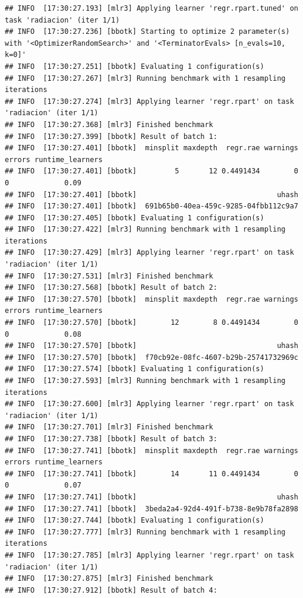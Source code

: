 \documentclass[
  11pt,
  a4paper,
]{article}
\begin{document}
\begin{verbatim}
## INFO  [17:30:27.193] [mlr3] Applying learner 'regr.rpart.tuned' on task 'radiacion' (iter 1/1)
## INFO  [17:30:27.236] [bbotk] Starting to optimize 2 parameter(s) with '<OptimizerRandomSearch>' and '<TerminatorEvals> [n_evals=10, k=0]'
## INFO  [17:30:27.251] [bbotk] Evaluating 1 configuration(s)
## INFO  [17:30:27.267] [mlr3] Running benchmark with 1 resampling iterations
## INFO  [17:30:27.274] [mlr3] Applying learner 'regr.rpart' on task 'radiacion' (iter 1/1)
## INFO  [17:30:27.368] [mlr3] Finished benchmark
## INFO  [17:30:27.399] [bbotk] Result of batch 1:
## INFO  [17:30:27.401] [bbotk]  minsplit maxdepth  regr.rae warnings errors runtime_learners
## INFO  [17:30:27.401] [bbotk]         5       12 0.4491434        0      0             0.09
## INFO  [17:30:27.401] [bbotk]                                 uhash
## INFO  [17:30:27.401] [bbotk]  691b65b0-40ea-459c-9285-04fbb112c9a7
## INFO  [17:30:27.405] [bbotk] Evaluating 1 configuration(s)
## INFO  [17:30:27.422] [mlr3] Running benchmark with 1 resampling iterations
## INFO  [17:30:27.429] [mlr3] Applying learner 'regr.rpart' on task 'radiacion' (iter 1/1)
## INFO  [17:30:27.531] [mlr3] Finished benchmark
## INFO  [17:30:27.568] [bbotk] Result of batch 2:
## INFO  [17:30:27.570] [bbotk]  minsplit maxdepth  regr.rae warnings errors runtime_learners
## INFO  [17:30:27.570] [bbotk]        12        8 0.4491434        0      0             0.08
## INFO  [17:30:27.570] [bbotk]                                 uhash
## INFO  [17:30:27.570] [bbotk]  f70cb92e-08fc-4607-b29b-25741732969c
## INFO  [17:30:27.574] [bbotk] Evaluating 1 configuration(s)
## INFO  [17:30:27.593] [mlr3] Running benchmark with 1 resampling iterations
## INFO  [17:30:27.600] [mlr3] Applying learner 'regr.rpart' on task 'radiacion' (iter 1/1)
## INFO  [17:30:27.701] [mlr3] Finished benchmark
## INFO  [17:30:27.738] [bbotk] Result of batch 3:
## INFO  [17:30:27.741] [bbotk]  minsplit maxdepth  regr.rae warnings errors runtime_learners
## INFO  [17:30:27.741] [bbotk]        14       11 0.4491434        0      0             0.07
## INFO  [17:30:27.741] [bbotk]                                 uhash
## INFO  [17:30:27.741] [bbotk]  3beda2a4-92d4-491f-b738-8e9b78fa2898
## INFO  [17:30:27.744] [bbotk] Evaluating 1 configuration(s)
## INFO  [17:30:27.777] [mlr3] Running benchmark with 1 resampling iterations
## INFO  [17:30:27.785] [mlr3] Applying learner 'regr.rpart' on task 'radiacion' (iter 1/1)
## INFO  [17:30:27.875] [mlr3] Finished benchmark
## INFO  [17:30:27.912] [bbotk] Result of batch 4:

\end{verbatim}
\end{document}
